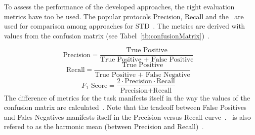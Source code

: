 To assess the performance of the developed approaches, the right evaluation metrics
have too be used.
The popular protocols Precision, Recall and the \fone\ are used for
comparison among approaches for \ac{STD}~\citep{long_scene_2021}.
The metrics are derived with values from the confusion matrix (see
Tabel~\ref{tb:confusionMatrix})~\citep{davis_relationship_2006}.
\begin{table}[ht]
    \centering\scriptsize
    \caption{Confusion Matrix\label{tb:confusionMatrix}}
\end{table}
\begin{equation}\label{eq:P}
    \text{Precision}=\frac{\text{True Positive}}{\text{True Positive + False Positive}}
\end{equation}
\begin{equation}\label{eq:R}
    \text{Recall}=\frac{\text{True Positive}}{\text{True Positive + False Negative}}
\end{equation}
\begin{equation}\label{eq:f1}
    F_1\text{-Score}=\frac{2\cdot \text{Precision}\cdot \text{Recall}}{\text{Precision}+\text{Recall}}
\end{equation}
The difference of metrics for the task manifests itself in the way the values of the confusion matrix
are calculated~\citep{long_scene_2021}.
Note that the tradeoff between False Positives and Fales Negatives manifests itself in the
Precision-versus-Recall curve~\citep{su_relationship_2015}.
\fone\ is also refered to as the harmonic mean (between Precision and
Recall)~\citep{he_icpr2018_2018}.
